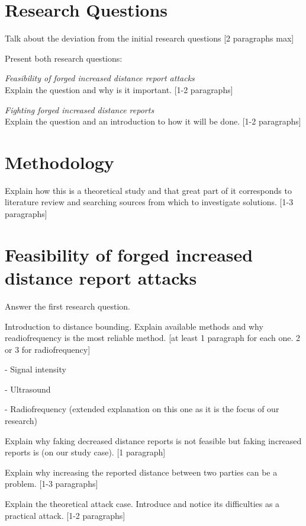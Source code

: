 \documentclass{article}
\begin{document}
\section{Research Questions}

Talk about the deviation from the initial research questions [2 paragraphs max]

Present both research questions:

\emph{Feasibility of forged increased distance report attacks}\\

Explain the question and why is it important. [1-2 paragraphs]

\emph{Fighting forged increased distance reports}\\

Explain the question and an introduction to how it will be done. [1-2 paragraphs]

\section{Methodology}

Explain how this is a theoretical study and that great part of it corresponds to literature review and searching sources from which to investigate solutions. [1-3 paragraphs]

\section{Feasibility of forged increased distance report attacks}

Answer the first research question.

Introduction to distance bounding. Explain available methods and why readiofrequency is the most reliable method. [at least 1 paragraph for each one. 2 or 3 for radiofrequency]

- Signal intensity

- Ultrasound

- Radiofrequency (extended explanation on this one as it is the focus of our research)

Explain why faking decreased distance reports is not feasible but faking increased reports is (on our study case). [1 paragraph]

Explain why increasing the reported distance between two parties can be a problem. [1-3 paragraphs]

Explain the theoretical attack case. Introduce and notice its difficulties as a practical attack. [1-2 paragraphs]
\end{document}
